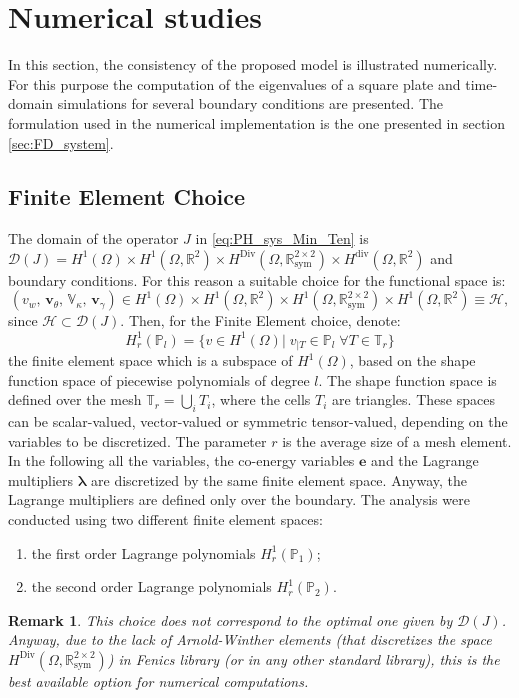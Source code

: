 \documentclass[11pt]{article}
\newtheorem{remark}{Remark}
\begin{document}
	{
		\section{Numerical studies}
		\label{sec:Num}
		In this section, the consistency of the proposed model is illustrated numerically. For this purpose the computation of the eigenvalues of a square plate and time-domain simulations for several boundary conditions are presented. The formulation used in the numerical implementation is the one presented in section \ref{sec:FD_system}. 
		\subsection{Finite Element Choice}
		The domain of the operator $J$ in \eqref{eq:PH_sys_Min_Ten} is $\mathcal{D}(J) = H^{1}(\Omega) \times H^{1}(\Omega, \mathbb{R}^2) \times H^{\text{Div}}(\Omega, \mathbb{R}^{2 \times 2}_{\text{sym}}) \times H^{\text{div}}(\Omega, \mathbb{R}^2)$ and boundary conditions. For this reason a suitable choice for the functional space is:
		\begin{equation*}
		(v_w, \, \bm{v}_\theta, \, \mathbb{V}_\kappa, \, \bm{v}_{\gamma}) \in H^{1}(\Omega) \times H^{1}(\Omega, \mathbb{R}^2) \times H^{1}(\Omega, \mathbb{R}^{2 \times 2}_{\text{sym}}) \times H^{1}(\Omega, \mathbb{R}^2) \equiv \mathscr{H},
		\end{equation*}
		since $\mathscr{H} \subset \mathcal{D}(J)$. Then, for the Finite Element choice, denote:
		\[ H_r^1(\mathbb{P}_l) = \{ v \in H^1(\Omega)|\; v_{|T} \in \mathbb{P}_l \; \forall T \in \mathbb{T}_r \} 
		\]
		the finite element space which is a subspace of $H^1(\Omega)$, based on the shape function space of piecewise polynomials of degree $l$. The shape function space is defined over the mesh $\mathbb{T}_r = \bigcup_i T_i$, where the cells $T_i$ are triangles. These spaces can be scalar-valued, vector-valued or symmetric tensor-valued, depending on the variables to be discretized. The parameter $r$ is the average size of a mesh element. In the following all the variables, the co-energy variables $\bm{e}$ and the Lagrange multipliers $\bm\lambda$ are discretized by the same finite element space. Anyway, the Lagrange multipliers are defined only over the boundary. The analysis were conducted using two different finite element spaces:
		\begin{enumerate}
			\item the first order Lagrange polynomials $H_r^1(\mathbb{P}_1)$;
			\item the second order Lagrange polynomials $H_r^1(\mathbb{P}_2)$.
		\end{enumerate}
		\begin{remark}
			This choice does not correspond to the optimal one given by $\mathcal{D}(J)$. Anyway, due to the lack of Arnold-Winther elements \cite{Arnold2002} (that discretizes the space $H^{\text{Div}}(\Omega, \mathbb{R}^{2 \times 2}_{\text{sym}})$) in Fenics library (or in any other standard library), this is the best available option for numerical computations.
		\end{remark}
}
\end{document}
